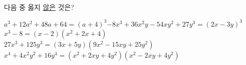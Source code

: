 다음 중 옳지 \underline{않은} 것은?
\begin{choicesv}{$a^3+12a^2+48a+64=(a+4)^3$}{$-8x^3+36x^2y-54xy^2+27y^3=(2x-3y)^3$}{$x^3-8=(x-2)(x^2+2x+4)$}{$27x^3+125y^3=(3x+5y)(9x^2-15xy+25y^2)$}{$x^4+4x^2y^2+16y^4=(x^2+2xy+4y^2)(x^2-2xy+4y^2)$}\end{choicesv}
